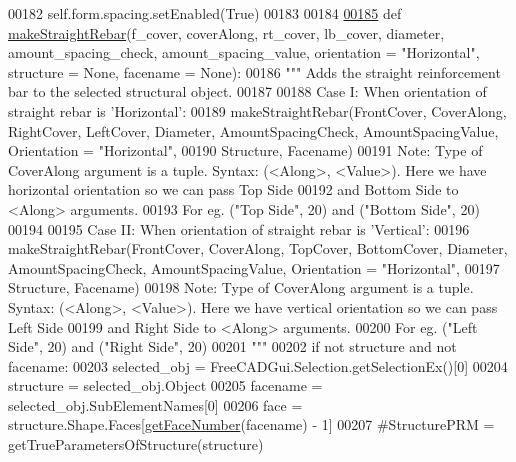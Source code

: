 \begin{DoxyCode}
00182         self.form.spacing.setEnabled(\textcolor{keyword}{True})
00183 
00184 
\hypertarget{StraightRebar_8py_source.tex_l00185}{}\hyperlink{namespaceStraightRebar_af6270367d7beae457813e33718d80faf}{00185} \textcolor{keyword}{def }\hyperlink{namespaceStraightRebar_af6270367d7beae457813e33718d80faf}{makeStraightRebar}(f\_cover, coverAlong, rt\_cover, lb\_cover, diameter, 
      amount\_spacing\_check, amount\_spacing\_value, orientation = "Horizontal", structure = None, facename = None):
00186     \textcolor{stringliteral}{""" Adds the straight reinforcement bar to the selected structural object.}
00187 \textcolor{stringliteral}{}
00188 \textcolor{stringliteral}{    Case I: When orientation of straight rebar is 'Horizontal':}
00189 \textcolor{stringliteral}{        makeStraightRebar(FrontCover, CoverAlong, RightCover, LeftCover, Diameter, AmountSpacingCheck,
       AmountSpacingValue, Orientation = "Horizontal",}
00190 \textcolor{stringliteral}{        Structure, Facename)}
00191 \textcolor{stringliteral}{        Note: Type of CoverAlong argument is a tuple. Syntax: (<Along>, <Value>). Here we have horizontal
       orientation so we can pass Top Side}
00192 \textcolor{stringliteral}{        and Bottom Side to <Along> arguments.}
00193 \textcolor{stringliteral}{        For eg. ("Top Side", 20) and ("Bottom Side", 20)}
00194 \textcolor{stringliteral}{}
00195 \textcolor{stringliteral}{    Case II: When orientation of straight rebar is 'Vertical':}
00196 \textcolor{stringliteral}{        makeStraightRebar(FrontCover, CoverAlong, TopCover, BottomCover, Diameter, AmountSpacingCheck,
       AmountSpacingValue, Orientation = "Horizontal",}
00197 \textcolor{stringliteral}{        Structure, Facename)}
00198 \textcolor{stringliteral}{        Note: Type of CoverAlong argument is a tuple. Syntax: (<Along>, <Value>). Here we have vertical
       orientation so we can pass Left Side}
00199 \textcolor{stringliteral}{        and Right Side to <Along> arguments.}
00200 \textcolor{stringliteral}{        For eg. ("Left Side", 20) and ("Right Side", 20)}
00201 \textcolor{stringliteral}{    """}
00202     \textcolor{keywordflow}{if} \textcolor{keywordflow}{not} structure \textcolor{keywordflow}{and} \textcolor{keywordflow}{not} facename:
00203         selected\_obj = FreeCADGui.Selection.getSelectionEx()[0]
00204         structure = selected\_obj.Object
00205         facename = selected\_obj.SubElementNames[0]
00206     face = structure.Shape.Faces[\hyperlink{namespaceRebarfunc_a3885b3b63e3a41508ac79bc7550cf301}{getFaceNumber}(facename) - 1]
00207     \textcolor{comment}{#StructurePRM = getTrueParametersOfStructure(structure)}

\end{DoxyCode}
